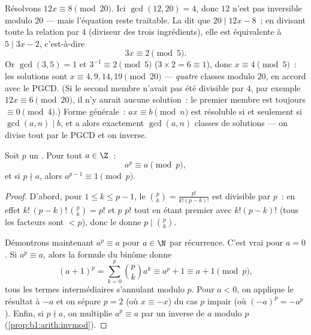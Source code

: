 \begin{example}\label{ex:b1:arith:noninvertible}
Résolvons $12x \equiv 8 \pmod{20}$. Ici $\gcd(12, 20) = 4$, donc $12$
n'est pas inversible modulo $20$ --- mais l'équation reste
traitable. La  dit que $20 \mid 12x - 8$~; en divisant
toute la relation par $4$ (diviseur des trois ingrédients), elle est
équivalente à $5 \mid 3x - 2$, c'est-à-dire
\[
3x \equiv 2 \pmod 5 .
\]
Or $\gcd(3, 5) = 1$ et $3^{-1} \equiv 2 \pmod 5$ ($3 \times 2 =
6 \equiv 1$), donc $x \equiv 4 \pmod 5$~: les solutions sont $x
\equiv 4, 9, 14, 19 \pmod{20}$ --- \emph{quatre} classes modulo $20$,
en accord avec le PGCD. (Si le second membre n'avait pas été divisible par $4$,
par exemple $12x \equiv 6 \pmod{20}$, il n'y aurait aucune solution~:
le premier membre est toujours $\equiv 0 \pmod 4$.) Forme générale~: $ax
\equiv b \pmod n$ est résoluble si et seulement si $\gcd(a, n) \mid b$, et a
alors exactement $\gcd(a, n)$ classes de solutions --- on divise tout
par le PGCD et on inverse.
\end{example}

\begin{theorem}\label{thm:b1:arith:fermat}
Soit $p$ un . Pour tout $a \in \Z$~:
\[
a^p \equiv a \pmod p,
\]
et si $p \nmid a$, alors $a^{p-1} \equiv 1 \pmod
p$.
\end{theorem}

\begin{proof}
D'abord, pour $1 \leq k \leq p - 1$, le  $\binom pk
= \frac{p!}{k!(p-k)!}$ est divisible par $p$~: en effet $k!\,(p-k)!\,
\binom pk = p!$ et $p$  $p!$ tout en étant premier avec $k!(p-k)!$
(tous les facteurs sont $< p$), donc le  donne $p \mid \binom pk$.

Démontrons maintenant $a^p \equiv a$ pour $a \in \N$ par récurrence. C'est vrai pour $a =
0$. Si $a^p \equiv a$, alors la formule du binôme donne
\[
(a+1)^p = \sum_{k=0}^{p} \binom pk a^k
\equiv a^p + 1 \equiv a + 1 \pmod p,
\]
tous les termes intermédiaires s'annulant modulo $p$. Pour $a < 0$, on applique le résultat à
$-a$ et on sépare $p = 2$ (où $x \equiv -x$) du cas $p$ impair (où
$(-a)^p = -a^p$). Enfin, si $p \nmid a$, on multiplie $a^p \equiv a$ par
un inverse de $a$ modulo $p$ (\cref{prop:b1:arith:invmod}).
\end{proof}

